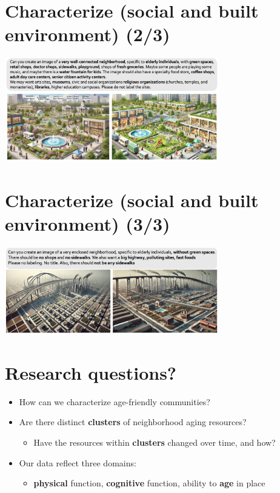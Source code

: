 \documentclass[
  letterpaper,
  DIV=11,
  numbers=noendperiod]{scrartcl}
\providecommand{\tightlist}{%
  \setlength{\itemsep}{0pt}\setlength{\parskip}{0pt}}\usepackage{longtable,booktabs,array}
\begin{document}
\hypertarget{characterize-social-and-built-environment-23}{%
\section{Characterize (social and built environment)
(2/3)}\label{characterize-social-and-built-environment-23}}

\includegraphics[width=0.7\textwidth,height=\textheight]{imgs/connectedNeighborhoodsC.png}

\hypertarget{characterize-social-and-built-environment-33}{%
\section{Characterize (social and built environment)
(3/3)}\label{characterize-social-and-built-environment-33}}

\includegraphics[width=0.7\textwidth,height=\textheight]{imgs/connectedNeighborhoodsD.png}

\hypertarget{research-questions}{%
\section{Research questions?}\label{research-questions}}

\begin{itemize}
\tightlist
\item
  How can we characterize age-friendly communities?
\item
  Are there distinct \textbf{clusters} of neighborhood aging resources?

  \begin{itemize}
  \tightlist
  \item
    Have the resources within \textbf{clusters} changed over time, and
    how?
  \end{itemize}
\item
  Our data reflect three domains:

  \begin{itemize}
  \tightlist
  \item
    \textbf{physical} function, \textbf{cognitive} function, ability to
    \textbf{age} in place
  \end{itemize}
\end{itemize}
\end{document}

